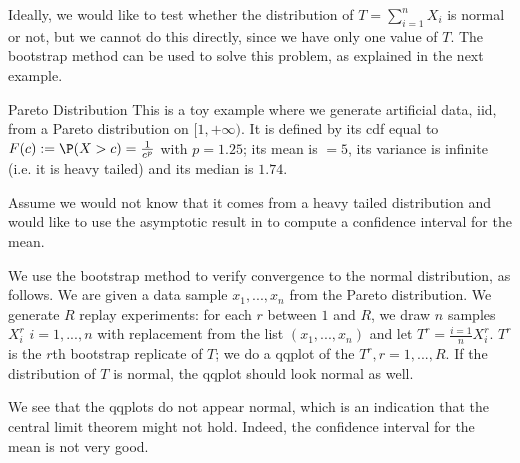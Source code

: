 Ideally, we would like to test whether the
distribution of $T=\sum_{i=1}^{n} X_i$ is normal
or not, but we cannot do this directly, since we
have only one value of $T$. The bootstrap method
can be used to solve this problem, as explained
in the next example.


\begin{figure}\center
\end{figure}

\begin{ex}{Pareto Distribution}  This is a toy example where we generate
artificial data, iid, from a Pareto
distribution on $[1,+\infty)$. It is defined by
its cdf equal to $F(c):=\P(X >
c)=\frac{1}{c^{p}}$ with $p=1.25$; its mean is
$=5$, its variance is infinite (i.e. it is heavy
tailed) and its median is $1.74$.

Assume we would not know that it comes from a
heavy tailed distribution and would like to use
the asymptotic result in  to
compute a confidence interval for the mean.

We use the bootstrap method to verify convergence
to the normal distribution, as follows. We are
given a data sample $x_1, ...,x_n$ from the
Pareto distribution. We generate $R$ replay
experiments: for each $r$ between $1$ and $R$, we
draw $n$ samples $X^r_i$ $i=1,...,n$ with
replacement from the list $(x_1, ..., x_n)$ and
let $T^r=\frac{i=1}{n}X^r_i$. $T^r$ is the $r$th
bootstrap replicate of $T$; we do a qqplot of the
$T^r, r=1,...,R$. If the distribution of $T$ is
normal, the qqplot should look normal as well.

We see that the qqplots do not appear normal,
which is an indication that the central limit
theorem might not hold. Indeed, the confidence
interval for the mean is not very good.
\end{ex}



